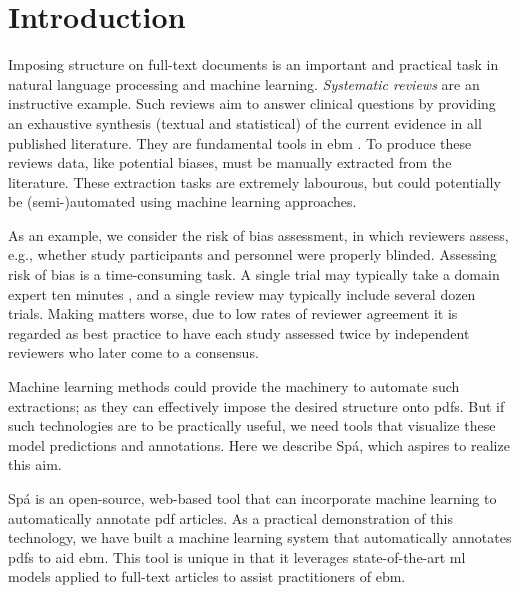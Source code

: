 \documentclass[runningheads,a4paper]{llncs}
\begin{document}
\acresetall
{}

\section{Introduction}
\label{section:intro}

Imposing structure on full-text documents is an important and practical task in natural language processing and machine learning.
\emph{Systematic reviews} are an instructive example.
Such reviews aim to answer clinical questions by providing an exhaustive synthesis (textual and statistical) of the current evidence in all published literature.
They are fundamental tools in \ac{ebm} \cite{sackett1996}.
To produce these reviews data, like potential biases, must be manually extracted from the literature.
These extraction tasks are extremely labourous, but could potentially be (semi-)automated using machine learning approaches.

As an example, we consider the risk of bias assessment, in which reviewers assess, e.g., whether study participants and personnel were properly blinded.
Assessing risk of bias is a time-consuming task.
A single trial may typically take a domain expert ten minutes \cite{Hartling2011}, and a single review may typically include several dozen trials.
Making matters worse, due to low rates of reviewer agreement it is regarded as best practice to have each study assessed twice by independent reviewers who later come to a consensus.\cite{Hartling2009}

Machine learning methods could provide the machinery to automate such extractions; as they can effectively impose the desired structure onto \acp{pdf}.
But if such technologies are to be practically useful, we need tools that visualize these model predictions and annotations.
Here we describe Spá, which aspires to realize this aim.

Spá is an open-source, web-based tool that can incorporate machine learning to automatically annotate \ac{pdf} articles.
As a practical demonstration of this technology, we have built a machine learning system that automatically annotates \acp{pdf} to aid \ac{ebm}.
This tool is unique in that it leverages state-of-the-art \ac{ml} models applied to full-text articles to assist practitioners of \ac{ebm}.
\end{document}
